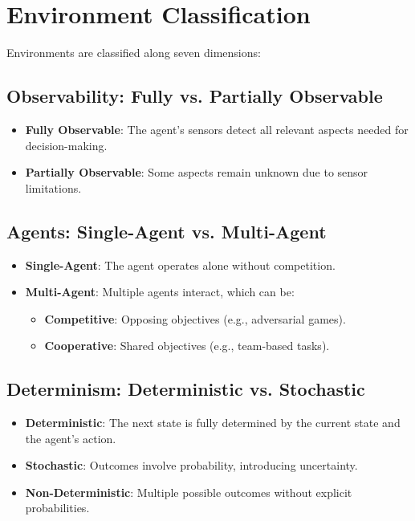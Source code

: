 \documentclass[conference]{IEEEtran}
\begin{document}
\section{Environment Classification}
Environments are classified along seven dimensions:

\subsection{Observability: Fully vs. Partially Observable}
\begin{itemize}
    \item \textbf{Fully Observable}: The agent's sensors detect all relevant aspects needed for decision-making.
    \item \textbf{Partially Observable}: Some aspects remain unknown due to sensor limitations.
\end{itemize}

\subsection{Agents: Single-Agent vs. Multi-Agent}
\begin{itemize}
    \item \textbf{Single-Agent}: The agent operates alone without competition.
    \item \textbf{Multi-Agent}: Multiple agents interact, which can be:
    \begin{itemize}
        \item \textbf{Competitive}: Opposing objectives (e.g., adversarial games).
        \item \textbf{Cooperative}: Shared objectives (e.g., team-based tasks).
    \end{itemize}
\end{itemize}

\subsection{Determinism: Deterministic vs. Stochastic}
\begin{itemize}
    \item \textbf{Deterministic}: The next state is fully determined by the current state and the agent's action.
    \item \textbf{Stochastic}: Outcomes involve probability, introducing uncertainty.
    \item \textbf{Non-Deterministic}: Multiple possible outcomes without explicit probabilities.
\end{itemize}
\end{document}
